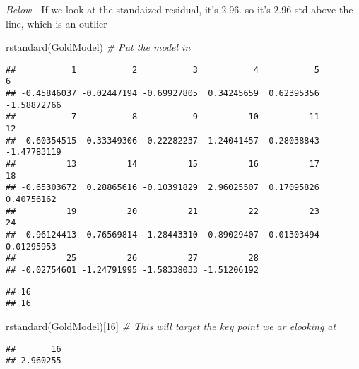 \documentclass[
]{article}
\newenvironment{Shaded}{\begin{snugshade}}{\end{snugshade}}
\newcommand{\CommentTok}[1]{\textcolor[rgb]{0.56,0.35,0.01}{\textit{#1}}}
\newcommand{\DecValTok}[1]{\textcolor[rgb]{0.00,0.00,0.81}{#1}}
\newcommand{\FunctionTok}[1]{\textcolor[rgb]{0.00,0.00,0.00}{#1}}
\newcommand{\NormalTok}[1]{#1}
\newcommand{\SpecialCharTok}[1]{\textcolor[rgb]{0.00,0.00,0.00}{#1}}
\begin{document}
\emph{Below} - If we look at the standaized residual, it's 2.96. so it's
2.96 std above the line, which is an outlier

\begin{Shaded}
\begin{Highlighting}[]
\FunctionTok{rstandard}\NormalTok{(GoldModel) }\CommentTok{\# Put the model in }
\end{Highlighting}
\end{Shaded}

\begin{verbatim}
##           1           2           3           4           5           6 
## -0.45846037 -0.02447194 -0.69927805  0.34245659  0.62395356 -1.58872766 
##           7           8           9          10          11          12 
## -0.60354515  0.33349306 -0.22282237  1.24041457 -0.28038843 -1.47783119 
##          13          14          15          16          17          18 
## -0.65303672  0.28865616 -0.10391829  2.96025507  0.17095826  0.40756162 
##          19          20          21          22          23          24 
##  0.96124413  0.76569814  1.28443310  0.89029407  0.01303494  0.01295953 
##          25          26          27          28 
## -0.02754601 -1.24791995 -1.58338033 -1.51206192
\end{verbatim}

\begin{Shaded}
\end{Shaded}

\begin{verbatim}
## 16 
## 16
\end{verbatim}

\begin{Shaded}
\begin{Highlighting}[]
\FunctionTok{rstandard}\NormalTok{(GoldModel)[}\DecValTok{16}\NormalTok{] }\CommentTok{\# This will target the key point we ar elooking at }
\end{Highlighting}
\end{Shaded}

\begin{verbatim}
##       16 
## 2.960255
\end{verbatim}
\end{document}
